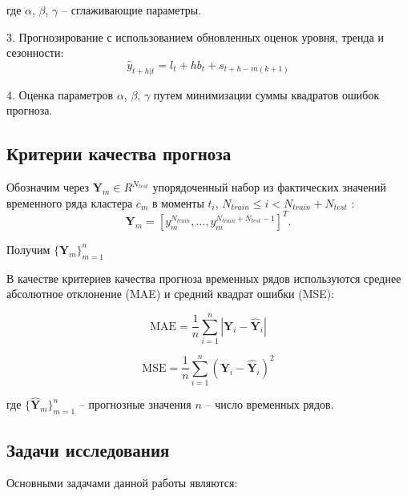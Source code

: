 где $\alpha$, $\beta$, $\gamma$ -- сглаживающие параметры.

3. Прогнозирование с использованием обновленных оценок уровня, тренда и сезонности:
\begin{equation}
\hat{y}_{t+h|t} = l_t + hb_t + s_{t+h-m(k+1)}
\end{equation}

4. Оценка параметров $\alpha$, $\beta$, $\gamma$ путем минимизации суммы квадратов ошибок прогноза.


\subsection{Критерии качества прогноза}

Обозначим через  $\mathbf{Y}_m \in R^{N_{test}}$ упорядоченный набор из  фактических значений временного ряда  кластера $c_m$ в моменты $t_i$, $N_{train} \leq i < N_{train} + N_{test}$ :
\begin{equation}
     \mathbf{Y}_m = [y_m^{N_{train}}, \ldots, y_m^{N_{train} + N_{test} - 1}]^T.
\end{equation}

Получим
$\{\mathbf{Y}_m\}_{m=1}^{n}$

 

В качестве критериев качества прогноза временных рядов используются среднее абсолютное отклонение (MAE) и средний квадрат ошибки (MSE):

\begin{equation}
\text{MAE} = \frac{1}{n}\sum\limits_{i = 1}^{n}|\mathbf{Y}_i - \mathbf{\hat{Y}}_i|
\end{equation}

\begin{equation}
\text{MSE} = \frac{1}{n}\sum\limits_{i = 1}^{n}(\mathbf{Y}_i - \mathbf{\hat{Y}}_i)^2
\end{equation}

где $\{\mathbf{\hat{Y}}_m\}_{m=1}^{n}$ -- прогнозные значения $n$ -- число временных рядов.





\subsection{Задачи исследования}

Основными задачами данной работы являются:

